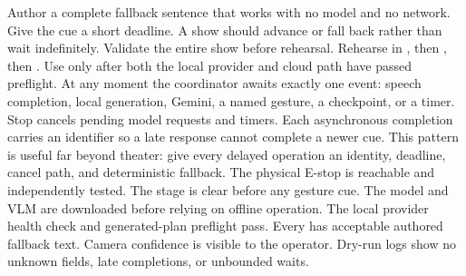 Author a complete fallback sentence that works with no model and no network.\markdownRendererOlItemEnd 
{}Give the cue a short deadline. A show should advance or fall back rather\markdownRendererSoftLineBreak
{}than wait indefinitely.\markdownRendererOlItemEnd 
{}Validate the entire show before rehearsal.\markdownRendererOlItemEnd 
{}Rehearse in , then , then .\markdownRendererOlItemEnd 
{}Use  only after both the local provider and cloud path have\markdownRendererSoftLineBreak
{}passed preflight.\markdownRendererOlItemEnd 
\markdownRendererOlEnd \markdownRendererInterblockSeparator
{}
\markdownRendererSectionEnd \markdownRendererSectionBegin
{}\markdownRendererInterblockSeparator
{}At any moment the coordinator awaits exactly one event: speech completion,\markdownRendererSoftLineBreak
{}local generation, Gemini, a named gesture, a checkpoint, or a timer. Stop\markdownRendererSoftLineBreak
{}cancels pending model requests and timers. Each asynchronous completion carries\markdownRendererSoftLineBreak
{}an identifier so a late response cannot complete a newer cue. This pattern is\markdownRendererSoftLineBreak
{}useful far beyond theater: give every delayed operation an identity, deadline,\markdownRendererSoftLineBreak
{}cancel path, and deterministic fallback.\markdownRendererInterblockSeparator
{}
\markdownRendererSectionEnd \markdownRendererSectionBegin
{}\markdownRendererInterblockSeparator
{}\markdownRendererUlBegin
\markdownRendererUlItem The physical E-stop is reachable and independently tested.\markdownRendererUlItemEnd 
\markdownRendererUlItem The stage is clear before any gesture cue.\markdownRendererUlItemEnd 
\markdownRendererUlItem The model and VLM are downloaded before relying on offline operation.\markdownRendererUlItemEnd 
\markdownRendererUlItem The local provider health check and generated-plan preflight pass.\markdownRendererUlItemEnd 
\markdownRendererUlItem Every  has acceptable authored fallback text.\markdownRendererUlItemEnd 
\markdownRendererUlItem Camera confidence is visible to the operator.\markdownRendererUlItemEnd 
\markdownRendererUlItem Dry-run logs show no unknown fields, late completions, or unbounded waits.\markdownRendererUlItemEnd 
